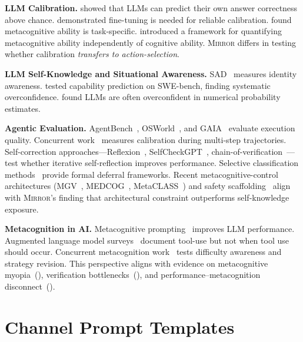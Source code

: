 \documentclass[10pt]{article}
\newcommand{\mirror}{\textsc{Mirror}}
\begin{document}
\textbf{LLM Calibration.}
\citet{kadavath2022language} showed that LLMs can predict their own answer correctness above chance. \citet{kapoor2024calibration} demonstrated fine-tuning is needed for reliable calibration. \citet{steyvers2025calibration} found metacognitive ability is task-specific. \citet{wang2025decoupling} introduced a framework for quantifying metacognitive ability independently of cognitive ability. \mirror{} differs in testing whether calibration \textit{transfers to action-selection}.

\textbf{LLM Self-Knowledge and Situational Awareness.}
SAD~\citep{laine2024me} measures identity awareness. \citet{barkan2025llms} tested capability prediction on SWE-bench, finding systematic overconfidence. \citet{xiong2023can} found LLMs are often overconfident in numerical probability estimates.

\textbf{Agentic Evaluation.}
AgentBench~\citep{liu2023agentbench}, OSWorld~\citep{xie2024osworld}, and GAIA~\citep{mialon2023gaia} evaluate execution quality. Concurrent work~\citep{htc2026} measures calibration during multi-step trajectories. Self-correction approaches---Reflexion~\citep{shinn2023reflexion}, SelfCheckGPT~\citep{manakul2023selfcheckgpt}, chain-of-verification~\citep{dhuliawala2023chainofverification}---test whether iterative self-reflection improves performance. Selective classification methods~\citep{geifman2017selective} provide formal deferral frameworks. Recent metacognitive-control architectures (MGV~\citep{oh2025mgv}, MEDCOG~\citep{zhao2026medcog}, MetaCLASS~\citep{liu2026metaclass}) and safety scaffolding~\citep{mosaic2026} align with \mirror{}'s finding that architectural constraint outperforms self-knowledge exposure.

\textbf{Metacognition in AI.}
Metacognitive prompting~\citep{wang2024metacognitive} improves LLM performance. Augmented language model surveys~\citep{mialon2023augmented} document tool-use but not when tool use should occur. Concurrent metacognition work~\citep{metacog2026} tests difficulty awareness and strategy revision. This perspective aligns with evidence on metacognitive myopia~(\citealp{scholten2024metacognitivemyopia}), verification bottlenecks~(\citealp{huemmer2026verificationbottleneck}), and performance--metacognition disconnect~(\citealp{fernandes2024disconnect}).

\section{Channel Prompt Templates}
\label{app:prompts-full}
\end{document}

